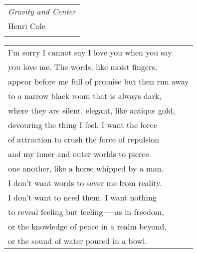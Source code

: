 \documentclass{article}
\begin{document}
\pagebreak

\begin{center}
  \begin{tabular}{l}

\textit{Gravity and Center} \\
Henri Cole \\
    \phantom{appear before me full of promise but then run away}\\
  \end{tabular}
  \end{center}

\vspace{-3em}

\begin{center}
  \begin{tabular}{l}

I'm sorry I cannot say I love you when you say \\
you love me. The words, like moist fingers, \\
appear before me full of promise but then run away \\
to a narrow black room that is always dark, \\
where they are silent, elegant, like antique gold, \\
devouring the thing I feel. I want the force \\
of attraction to crush the force of repulsion \\
and my inner and outer worlds to pierce \\
one another, like a horse whipped by a man. \\
I don't want words to sever me from reality. \\
I don't want to need them. I want nothing \\
to reveal feeling but feeling—--as in freedom, \\
or the knowledge of peace in a realm beyond, \\
or the sound of water poured in a bowl.

  \end{tabular}
  \end{center}
\end{document}
